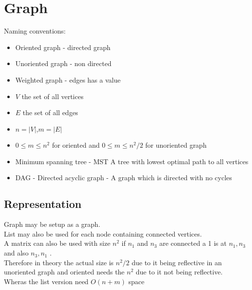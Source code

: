 \documentclass[12pt, a4paper]{article}
\begin{document}
	\section{Graph}
		Naming conventions:
		\begin{itemize}
			\item Oriented graph - directed graph
			\item Unoriented graph - non directed
			\item Weighted graph - edges has a value
			\item $V$ the set of all vertices
			\item $E$ the set of all edges
			\item $n=|V|$,$m=|E|$
			\item $0\leq m\leq n^2$ for oriented and $0\leq m \leq n^2/2$ for unoriented graph
			\item Minimum spanning tree - MST A tree with lowest optimal path to all vertices
			\item DAG - Directed acyclic graph - A graph which is directed with no cycles
		\end{itemize}
		\subsection{Representation}
			Graph may be setup as a graph.\\
			List may also be used for each node containing connected vertices.\\
			A matrix can also be used with size $n^2$ if $n_1$ and $n_3$ are connected a 1 is at $n_1,n_3$ and also $n_3,n_1$ .\\
			Therefore in theory the actual size is $n^2/2$ due to it being reflective in an unoriented graph and oriented needs the $n^2$ due to it not being reflective.\\
			Wheras the list version need $O(n+m)$ space
\end{document}
